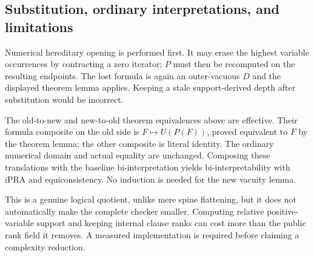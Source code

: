 \subsection{Substitution, ordinary interpretations, and limitations}
Numerical hereditary opening is performed first. It may erase the
highest variable occurrences by contracting a zero iterator; \(P\)
must then be recomputed on the resulting endpoints. The lost formula
is again an outer-vacuous \(D\) and the displayed theorem lemma applies.
Keeping a stale support-derived depth after substitution would be
incorrect.

The old-to-new and new-to-old theorem equivalences above are effective.
Their formula composite on the old side is \(F\mapsto U(P(F))\), proved
equivalent to \(F\) by the theorem lemma; the other composite is literal
identity. The ordinary numerical domain and actual equality are
unchanged. Composing these translations with the baseline
bi-interpretation yields bi-interpretability with iPRA and
equiconsistency. No induction is needed for the new vacuity lemma.

This is a genuine logical quotient, unlike mere spine flattening, but
it does not automatically make the complete checker smaller. Computing
relative positive-variable support and keeping internal clause ranks
can cost more than the public rank field it removes. A measured
implementation is required before claiming a complexity reduction.

